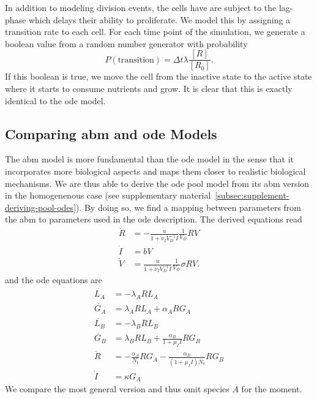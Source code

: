 \documentclass[10pt,A4paper]{article}
\numberwithin{equation}{section}
\begin{document}
In addition to modeling division events, the cells have are subject to the lag-phase which delays their ability to proliferate.
We model this by assigning a transition rate to each cell.
For each time point of the simulation, we generate a boolean value from a random number generator with probability
\begin{equation}
    P(\text{transition}) = \Delta t \lambda \frac{[R]}{[R_0]}.
\end{equation}
If this boolean is true, we move the cell from the inactive state to the active state where it starts to consume nutrients and grow.
It is clear that this is exactly identical to the \ac{ode} model.
%
%
%
\subsection{Comparing \acs{abm} and \acs{ode} Models}
The \ac{abm} model is more fundamental than the \ac{ode} model in the sense that it incorporates more biological aspects and maps them closer to realistic biological mechanisms.
We are thus able to derive the \ac{ode} pool model from its \ac{abm} version in the homogenenous case (see supplementary material~\ref{subsec:supplement-deriving-pool-odes}).
By doing so, we find a mapping between parameters from the \ac{abm} to parameters used in the \ac{ode} description.
The derived equations read
\begin{align}
    \dot{R} &= -\frac{u}{1+\nu_I V_D^{-1}I} \frac{1}{V_D} R V\\
    \dot{I} &= b V\\
    \dot{V} &= \frac{u}{1+\nu_I V_D^{-1} I} \frac{1}{V_D}\sigma R V.
\end{align}
and the \ac{ode} equations are
\begin{align}
    \dot{L_A} &= -\lambda_A R L_A\\
    \dot{G_A} &= \lambda_A R L_A + \alpha_A R G_A\\
    \dot{L_B} &= -\lambda_B R L_B\\
    \dot{G_B} &= \lambda_B R L_B + \frac{\alpha_B}{1 + \mu_I I} R G_B\\
    \dot{R} &= -\frac{\alpha_A}{N_t} R G_A-\frac{\alpha_B}{(1 + \mu_I I) N_t} R G_B \\
    \dot{I} &= \kappa G_A
\end{align}
We compare the most general version and thus omit species $A$ for the moment.
\end{document}
